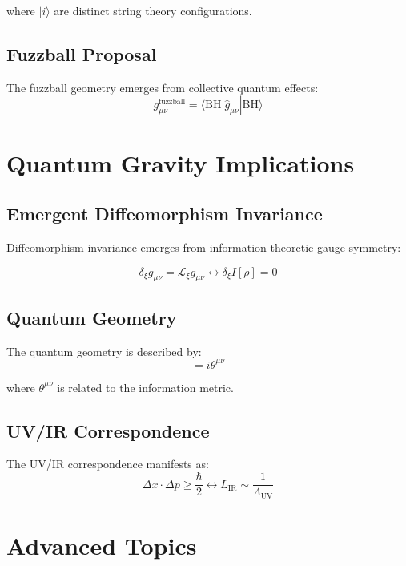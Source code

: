 \documentclass[12pt,a4paper]{article}
\begin{document}
where $|i\rangle$ are distinct string theory configurations.

\subsection{Fuzzball Proposal}

The fuzzball geometry emerges from collective quantum effects:
\begin{equation}
g_{\mu\nu}^{\text{fuzzball}} = \langle \text{BH} | \hat{g}_{\mu\nu} | \text{BH} \rangle
\end{equation}

\section{Quantum Gravity Implications}

\subsection{Emergent Diffeomorphism Invariance}

Diffeomorphism invariance emerges from information-theoretic gauge symmetry:

\begin{equation}
\delta_\xi g_{\mu\nu} = \mathcal{L}_\xi g_{\mu\nu} \leftrightarrow \delta_\xi I[\rho] = 0
\end{equation}

\subsection{Quantum Geometry}

The quantum geometry is described by:
\begin{equation}
[\hat{x}^\mu, \hat{x}^\nu] = i\theta^{\mu\nu}
\end{equation}

where $\theta^{\mu\nu}$ is related to the information metric.

\subsection{UV/IR Correspondence}

The UV/IR correspondence manifests as:
\begin{equation}
\Delta x \cdot \Delta p \geq \frac{\hbar}{2} \leftrightarrow L_{\text{IR}} \sim \frac{1}{\Lambda_{\text{UV}}}
\end{equation}

\section{Advanced Topics}
\end{document}
